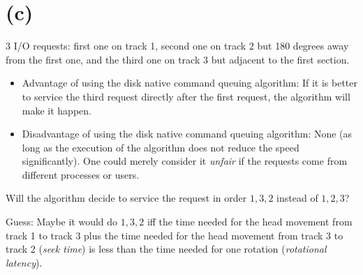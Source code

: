 \documentclass{article}
\begin{document}
\section{(c)}
3 I/O requests: first one on track 1, second one on track 2 but 180 degrees away from the first one, and the third one on track 3 but adjacent to the first section.
\begin{itemize}
\item Advantage of using the disk native command queuing algorithm: If it is better to service the third request directly after the first request, the algorithm will make it happen.
\item Disadvantage of using the disk native command queuing algorithm: None (as long as the execution of the algorithm does not reduce the speed significantly). One could merely consider it \emph{unfair} if the requests come from different processes or users.
\end{itemize}
Will the algorithm decide to service the request in order $1, 3, 2$ instead of $1, 2, 3$?

Guess: Maybe it would do $1, 3, 2$ iff the time needed for the head movement from track 1 to track 3 plus the time needed for the head movement from track 3 to track 2 (\emph{seek time}) is less than the time needed for one rotation (\emph{rotational latency}).
\end{document}

